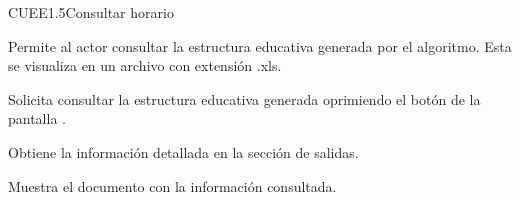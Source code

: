 \begin{UseCase}{CUEE1.5}{Consultar horario}{	
		
	Permite al actor consultar la estructura educativa generada por el algoritmo. Esta se visualiza en un archivo con extensión .xls.
	
}
{\begin{UClist}
		\end{UClist}
	}
\end{UseCase}

\begin{UCtrayectoria}
	\UCpaso [\UCactor] Solicita consultar la estructura educativa generada oprimiendo el botón  de la pantalla .
	
	\UCpaso [\UCsist] Obtiene la información detallada en la sección de salidas. 
	
	\UCpaso [\UCsist] Muestra el documento con la información consultada.
	
\end{UCtrayectoria}
